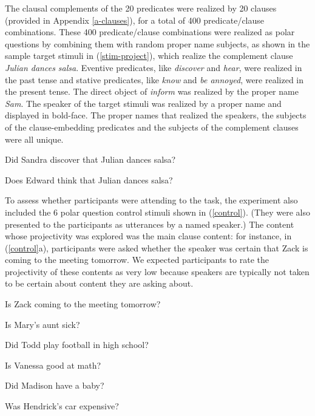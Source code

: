 \documentclass[11pt,fleqn]{article}
\newcommand{\6}{\mbox{$[\hspace*{-.6mm}[$}}
\newcommand{\9}{\mbox{$]\hspace*{-.6mm}]$}}
\begin{document}
The clausal complements of the 20 predicates were realized by 20 clauses (provided in Appendix \ref{a-clauses}), for a total of 400 predicate/clause combinations. These 400 predicate/clause combinations were realized as polar questions by combining them with random proper name subjects, as shown in the sample target stimuli in (\ref{stim-project}), which realize the complement clause {\em Julian dances salsa}. Eventive predicates, like {\em discover} and {\em hear}, were realized in the past tense and stative predicates, like {\em know} and {\em be annoyed}, were realized in the present tense. The direct object of {\em inform} was realized by the proper name {\em Sam}.  The speaker of the target stimuli was realized by a proper name and displayed in bold-face. The proper names that realized the speakers, the subjects of the clause-embedding predicates and the subjects of the complement clauses were all unique.

\begin{exe}
\ex\label{stim-project} 
\begin{xlist}
 Did Sandra discover that Julian dances salsa?

 Does Edward think that Julian dances salsa?
\end{xlist}
\end{exe}

To assess whether participants were attending to the task, the experiment also included the 6  polar question control stimuli shown in (\ref{control}). (They were also presented to the participants as utterances by a named speaker.) The content whose projectivity was explored was the main clause content: for instance, in (\ref{control}a), participants were asked whether the speaker was certain that Zack is coming to the meeting tomorrow. We expected participants to rate the projectivity of these contents as very low because speakers are typically not taken to be certain about content they are asking about.

\begin{exe}
\ex\label{control} 
\begin{xlist}

\ex   Is Zack coming to the meeting tomorrow?

\ex Is Mary's aunt sick?

\ex Did Todd play football in high school?

\ex Is Vanessa good at math?

\ex Did Madison have a baby?

\ex Was Hendrick's car expensive?

\end{xlist}
\end{exe}
\end{document}
